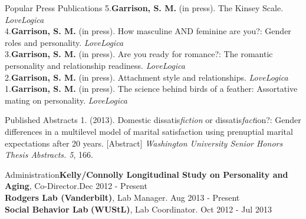 \documentclass {resume}
\begin{document}
\pagestyle{myheadings}
\begin{samepage}\begin{rSection}{\textrm{Popular Press Publications}}
5.\hspace* {2.5 mm}\textbf{Garrison, S. M.} (in press). The Kinsey Scale. \textit{LoveLogica}\smallskip\\
4.\hspace* {2.5 mm}\textbf{Garrison, S. M.} (in press). How masculine AND feminine are you?: Gender roles and personality. \textit{LoveLogica}\smallskip\\
3.\hspace* {2.5 mm}\textbf{Garrison, S. M.} (in press). Are you ready for romance?: The romantic personality and relationship readiness.
\hspace* {6 mm}\textit{LoveLogica}\smallskip\\
2.\hspace* {2.5 mm}\textbf{Garrison, S. M.} (in press). Attachment style and relationships. \textit{LoveLogica}\smallskip\\
1.\hspace* {2.5 mm}\textbf{Garrison, S. M.} (in press). The science behind birds of a feather: Assortative mating on personality. \textit{LoveLogica}
\end{rSection}\end{samepage}
\begin{samepage}\begin{rSection}{\textrm{Published Abstracts}}
1.\hspace* {2.5 mm}{\bf Garrison, S. M.} (2013). Domestic dissatis{\em fiction} or dissatis{\em fact}ion?: Gender differences in a multilevel model \hspace* {6 mm}of marital satisfaction using prenuptial marital expectations after 20 years. [Abstract] {\em Washington University \hspace* {6 mm}Senior Honors Thesis Abstracts. 5}, 166.\end{rSection}\end{samepage}
\begin{rSection}{\textrm{Administration}}\textbf{Kelly/Connolly Longitudinal Study on Personality and Aging}, Co-Director.\hfill Dec 2012 - Present\smallskip\\
\textbf{Rodgers Lab (Vanderbilt)}, Lab Manager. \hfill Aug 2013 - Present\smallskip\\
\textbf{Social Behavior Lab} \textbf{(WUStL)}, Lab Coordinator. \hfill Oct 2012 - Jul 2013
\end{rSection}
\end{document}
